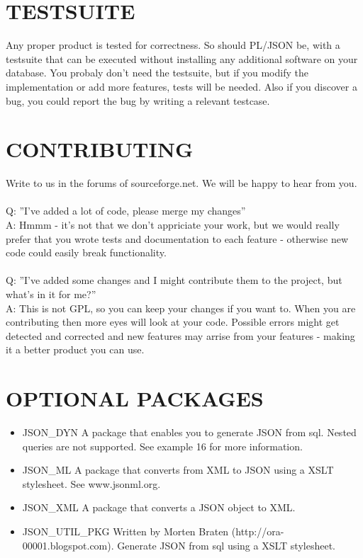 \documentclass[11pt,a4paper]{article}
\begin{document}
\section{TESTSUITE}
Any proper product is tested for correctness. So should PL/JSON be, with a testsuite that can be executed without installing any additional software on your database. You probaly don't need the testsuite, but if you modify the implementation or add more features, tests will be needed. Also if you discover a bug, you could report the bug by writing a relevant testcase.

\section{CONTRIBUTING}
Write to us in the forums of sourceforge.net. We will be happy to hear from you. \\\\
Q: ''I've added a lot of code, please merge my changes''\\
A: Hmmm - it's not that we don't appriciate your work, but we would really prefer that you wrote tests and documentation to each feature - otherwise new code could easily break functionality. \\\\
Q: ''I've added some changes and I might contribute them to the project, but what's in it for me?''\\
A: This is not GPL, so you can keep your changes if you want to. 
When you are contributing then more eyes will look at your code. 
Possible errors might get detected and corrected and new features may arrise from your features - making it a better product you can use.

\section{OPTIONAL PACKAGES}
\begin{itemize}
\item JSON\_DYN A package that enables you to generate JSON from sql. Nested queries are not supported. See example 16 for more information.
\item JSON\_ML A package that converts from XML to JSON using a XSLT stylesheet. See www.jsonml.org.
\item JSON\_XML A package that converts a JSON object to XML. 
\item JSON\_UTIL\_PKG Written by Morten Braten (http://ora-00001.blogspot.com). Generate JSON from sql using a XSLT stylesheet. 
\end{itemize}
\end{document}

